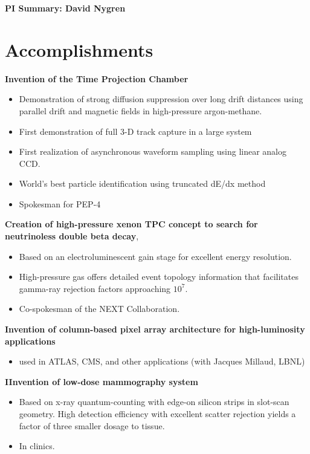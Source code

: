 
\begin{center}
\Large\textbf{PI Summary: David Nygren}
\end{center}


\section*{\textbf{Accomplishments}}


\noindent\textbf{Invention of the Time Projection Chamber}
\begin{itemize}[noitemsep,nolistsep]
\item{Demonstration of strong diffusion suppression over long drift distances using parallel drift and magnetic fields in high-pressure argon-methane.}
\item{First demonstration of full 3-D track capture in a large system}
\item{First realization of asynchronous waveform sampling using linear analog CCD.}
\item{World’s best particle identification using truncated dE/dx method}
\item{Spokesman for PEP-4}
\end{itemize}


\noindent\textbf{Creation of high-pressure xenon TPC concept to search for neutrinoless double beta decay}, 
\begin{itemize}[noitemsep,nolistsep]
\item{Based on an electroluminescent gain stage for excellent energy resolution.}
\item{High-pressure gas offers detailed event topology information that facilitates gamma-ray rejection factors approaching $10^7$.}
\item{Co-spokesman of the NEXT Collaboration.}
\end{itemize}

\noindent\textbf{Invention of column-based pixel array architecture for high-luminosity applications}
\begin{itemize}[noitemsep,nolistsep]
\item{used in ATLAS, CMS, and other applications (with Jacques Millaud, LBNL)}
\end{itemize}

\noindent\textbf{IInvention of low-dose mammography system} 
\begin{itemize}[noitemsep,nolistsep]
\item{Based on x-ray quantum-counting with edge-on silicon strips in slot-scan geometry. High detection efficiency with excellent scatter rejection yields a factor of three smaller dosage to tissue.}
\item{In clinics.}
\end{itemize}

